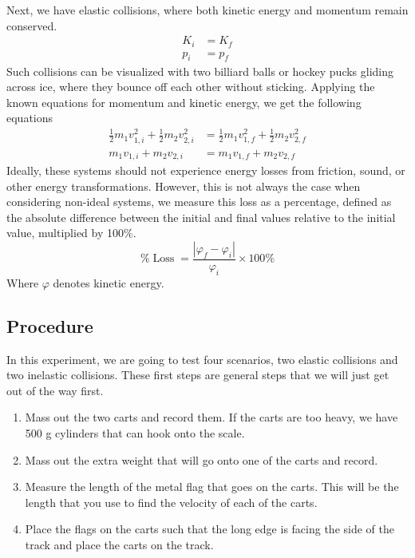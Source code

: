 \documentclass{report}
\begin{document}
    \bigbreak \noindent 
    Next, we have elastic collisions, where both kinetic energy and momentum remain conserved.
    \begin{equation}
        \begin{aligned}
            K_i & =K_f \\
            p_i & =p_f
        \end{aligned}
    \end{equation}
    \bigbreak \noindent 
    Such collisions can be visualized with two billiard balls or hockey pucks gliding across ice, where they bounce off each other without sticking. Applying the known equations for momentum and kinetic energy, we get the following equations
    \begin{equation}
        \begin{aligned}
            \frac{1}{2} m_1 v_{1, i}^2+\frac{1}{2} m_2 v_{2, i}^2 & =\frac{1}{2} m_1 v_{1, f}^2+\frac{1}{2} m_2 v_{2, f}^2 \\
            m_1 v_{1, i}+m_2 v_{2, i} & =m_1 v_{1, f}+m_2 v_{2, f}
        \end{aligned}
    \end{equation}
    \bigbreak \noindent 
    Ideally, these systems should not experience energy losses from friction, sound, or other energy transformations. However, this is not always the case when considering non-ideal systems, we measure this loss as a percentage, defined as the absolute difference between the initial and final values relative to the initial value, multiplied by 100\%.
    \begin{equation}
        \% \operatorname{Loss}=\frac{\left|\varphi_f-\varphi_i\right|}{\varphi_i} \times 100 \%
    \end{equation}
    \bigbreak \noindent 
    Where $\varphi$ denotes kinetic energy.

    \bigbreak \noindent 
    \subsection{Procedure}
    \bigbreak \noindent 
    In this experiment, we are going to test four scenarios, two elastic collisions and two inelastic collisions. These first steps are general steps that we will just get out of the way first.
    \begin{enumerate}
        \item Mass out the two carts and record them. If the carts are too heavy, we have 500 g cylinders that can hook onto the scale.
        \item Mass out the extra weight that will go onto one of the carts and record.
        \item Measure the length of the metal flag that goes on the carts. This will be the length that you use to find the velocity of each of the carts.
        \item Place the flags on the carts such that the long edge is facing the side of the track and place the carts on the track.
    \end{enumerate}
\end{document}
